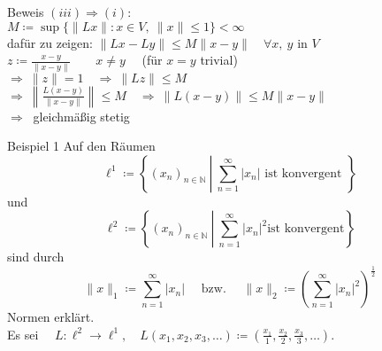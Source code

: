 \documentclass[AERbeamer%
,handout%
,optBeamerClassicFormat%
,optLeftEquations   %
]{AERlatex}
\begin{document}
%
    \begin{frame}{Beweis}
        \setlength{\baselineskip}{1.6\baselineskip}
%
        $(iii) \Rightarrow (i)$: \\ \pause
        $M\coloneqq\sup \{\|L x\|: x \in V,~\|x\| \leq 1\}<\infty$ \\ \pause
        dafür zu zeigen: $\|L x-L y\| \leq M\|x-y\| \quad \forall x, ~ y \text{ in } V$ \\ \pause
        $z\coloneqq\frac{x-y}{\|x-y\|} \qquad x \neq y \quad$ (für $x=y$ trivial) \\ \pause
        $\Rightarrow ~\|z\|=1 \quad \Rightarrow ~\|L z\| \leq M$ \\ \pause
        $\Rightarrow ~\left\|\frac{L(x-y)}{\|x-y\|}\right\| \leq M \quad \Rightarrow ~\|L(x-y)\| \leq M\|x-y\|$ \\ \pause
        $\Rightarrow ~$ gleichmäßig stetig
    \end{frame}
%
%
    \begin{frame}{Beispiel 1}
        \setlength{\baselineskip}{1.3\baselineskip}
        Auf den Räumen
        \begin{equation*}
            \ell^1\coloneqq \left\{\left(x_n\right)_{n \in \mathbb{N}} ~ \left| ~ \sum_{n=1}^{\infty} \right. |x_n| \text { ist konvergent }\right\}
        \end{equation*}
        und
        \begin{equation*}
            \ell^2\coloneqq \left\{\left(x_n\right)_{n \in \mathbb{N}} ~ \left| ~ \sum_{n=1}^{\infty} \right. \left|x_n\right|^2 \text{ist konvergent} \right\}
        \end{equation*}
        sind durch
        \begin{equation*}
            \|x\|_1\coloneqq\sum_{n=1}^{\infty}\left|x_n\right| \quad \text { bzw. } \quad\|x\|_2\coloneqq\left(\sum_{n=1}^{\infty}\left|x_n\right|^2\right)^{\frac{1}{2}}
        \end{equation*}
        Normen erklärt. \\
        Es sei $\quad L: \ell^2 \rightarrow \ell^1, \quad L\left(x_1, x_2, x_3, \ldots\right)\coloneqq\left(\frac{x_1}{1}, \frac{x_2}{2}, \frac{x_3}{3}, \ldots\right)$.
    \end{frame}
%
\end{document}
